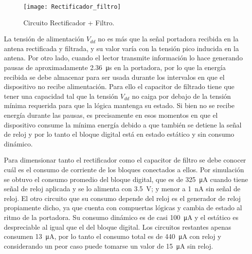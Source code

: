 \begin{figure}
	\centering
	\texttt{[image: Rectificador\_filtro]}
	\caption{Circuito Rectificador + Filtro.}
	\label{fig:RectificadorFiltro}
\end{figure}

La tensión de alimentación \(V_{dd}\) no es más que la señal portadora 
recibida en la antena rectificada y filtrada, y su valor varía con la 
tensión pico inducida en la antena. Por otro lado, cuando el lector 
transmite información lo hace generando pausas de aproximadamente 
\SI{2.36}{\micro\second} en la portadora, por lo 
que la energía recibida se debe almacenar para ser usada durante los 
intervalos en que el dispositivo no recibe alimentación. Para ello el 
capacitor de filtrado tiene que tener una capacidad tal que la tensión 
\(V_{dd}\) no caiga por debajo de la tensión mínima requerida para que 
la lógica mantenga su estado. Si bien no se recibe energía durante 
las pausas, es precisamente en esos momentos en que el dispositivo 
consume la mínima energía debido a que también se detiene la señal 
de reloj y por lo tanto el bloque digital está en estado estático y 
sin consumo dinámico.

Para dimensionar tanto el rectificador como el capacitor de filtro se 
debe conocer cuál es el consumo de corriente de los bloques conectados 
a ellos. Por simulación se obtuvo el consumo promedio del bloque 
digital, que es de \SI{325}{\micro\ampere} cuando tiene señal de reloj 
aplicada y se lo alimenta con \SI{3.5}{\volt}; y menor a 
\SI{1}{\nano\ampere} sin señal de reloj. El otro 
circuito que su consumo depende del reloj es el generador de reloj 
propiamente dicho, ya que cuenta con compuertas lógicas y cambia de 
estado al ritmo de la portadora. Su consumo dinámico es de casi 
\SI{100}{\micro\ampere} y el estático es despreciable al igual que el 
del bloque digital. Los circuitos restantes apenas 
consumen \SI{13}{\micro\ampere}, por lo tanto el consumo total es de 
\SI{440}{\micro\ampere} con reloj y considerando un peor caso puede 
tomarse un valor de \SI{15}{\micro\ampere} sin reloj.

